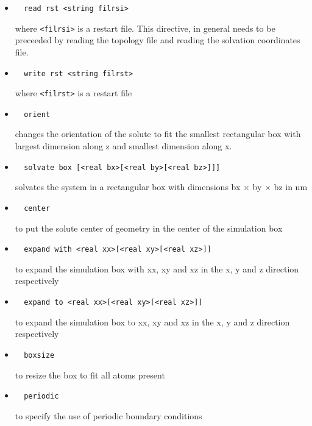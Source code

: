 \begin{itemize}
\item
\begin{verbatim}
  read rst <string filrsi>
\end{verbatim}
where \verb+<filrsi>+ is a restart file. This directive, in general needs
to be preceeded by reading the topology file and reading the solvation
coordinates file.

\item
\begin{verbatim}
  write rst <string filrst>
\end{verbatim}
where \verb+<filrst>+ is a restart file

\item
\begin{verbatim}
  orient
\end{verbatim}
changes the orientation of the solute to fit the smallest rectangular
box with largest dimension along z and smallest dimension along x.

\item
\begin{verbatim}
  solvate box [<real bx>[<real by>[<real bz>]]]
\end{verbatim}
solvates the system in a rectangular box with dimensions 
bx $\times$ by $\times$ bz in nm

\item
\begin{verbatim}
  center
\end{verbatim}
to put the solute center of geometry in the center of the
simulation box

\item
\begin{verbatim}
  expand with <real xx>[<real xy>[<real xz>]]
\end{verbatim}
to expand the simulation box with xx, xy and xz in the
x, y and z direction respectively

\item
\begin{verbatim}
  expand to <real xx>[<real xy>[<real xz>]]
\end{verbatim}
to expand the simulation box to xx, xy and xz in the
x, y and z direction respectively

\item
\begin{verbatim}
  boxsize
\end{verbatim}
to resize the box to fit all atoms present

\item
\begin{verbatim}
  periodic
\end{verbatim}
to specify the use of periodic boundary conditions


\end{itemize}
